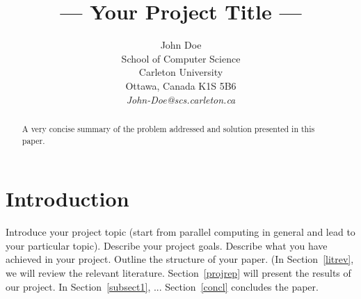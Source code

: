 \documentclass[11pt]{article}       %
\begin{document}


\title{--- Your Project Title ---}


\author{
John Doe\\
School of Computer Science\\
Carleton University\\
Ottawa, Canada K1S 5B6\\
{\em John-Doe@scs.carleton.ca}
} %

\maketitle

\begin{abstract}
A very concise summary of the problem addressed and solution presented in this paper.
\end{abstract}


\section{Introduction} \label{intro}

Introduce your project topic (start from parallel computing in
general and lead to your particular topic). Describe your project
goals. Describe what you have achieved in your project. Outline
the structure of your paper. (In Section~\ref{litrev}, we will
review the relevant literature. Section~\ref{projrep} will present
the results of our project. In Section~\ref{subsect1}, ...
Section~\ref{concl} concludes the paper.


\end{document}
